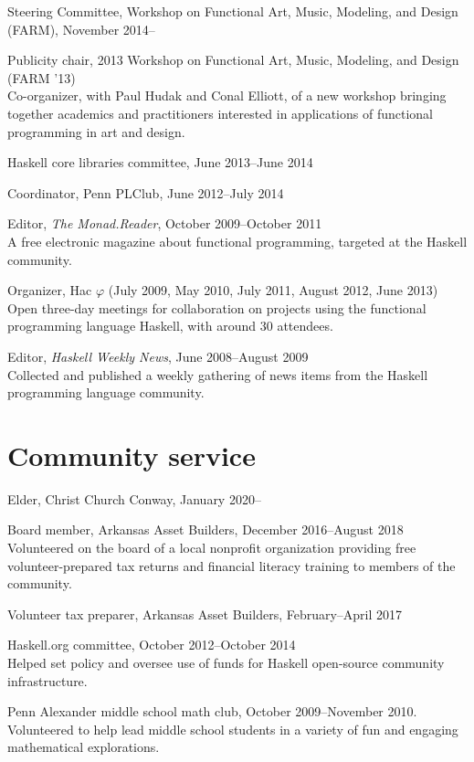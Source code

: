 \documentclass[12pt]{article}
\newcommand{\cvitem}{\par\hangpara{2em}{1}}
\begin{document}
\cvitem Steering Committee, Workshop on Functional Art, Music,
Modeling, and Design (FARM), November 2014--

\cvitem Publicity chair, 2013 Workshop on Functional Art, Music,
  Modeling, and Design (FARM '13) \\
  Co-organizer, with Paul Hudak and Conal Elliott, of a new workshop
  bringing together academics and practitioners interested in
  applications of functional programming in art and design.

\cvitem Haskell core libraries committee, June 2013--June 2014

\cvitem Coordinator, Penn PLClub, June 2012--July 2014

\cvitem Editor, \emph{The Monad.Reader}, October 2009--October 2011 \\
A free electronic magazine about functional programming, targeted at
the Haskell community.

\cvitem Organizer, Hac $\varphi$ (July 2009, May 2010, July 2011,
August 2012, June 2013) \\
Open three-day meetings for collaboration on projects using the functional
programming language Haskell, with around 30 attendees.

\cvitem Editor, \emph{Haskell Weekly News}, June 2008--August 2009 \\
Collected and published a weekly gathering of news items from the
Haskell programming language community.

\section*{Community service}

\cvitem Elder, Christ Church Conway, January 2020--

\cvitem Board member, Arkansas Asset Builders, December
2016--August 2018 \\
Volunteered on the board of a local nonprofit organization providing
free volunteer-prepared tax returns and financial literacy training to
members of the community.

\cvitem Volunteer tax preparer, Arkansas Asset Builders,
February--April 2017

\cvitem Haskell.org committee, October 2012--October 2014 \\
Helped set policy and oversee use of funds for Haskell open-source
community infrastructure.

\cvitem Penn Alexander middle school math club, October 2009--November
2010. \\
Volunteered to help lead middle school students in a variety of fun
and engaging mathematical explorations.
\end{document}
